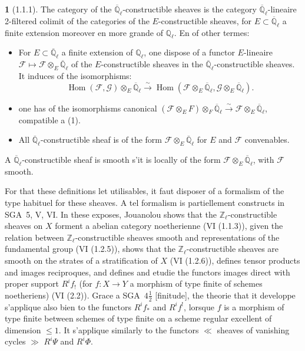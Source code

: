 \documentclass[12pt,a4paper]{article}
\theoremstyle{plain}
\theoremstyle{definition}
\theoremstyle{definition}
\newtheorem{para}{}[section]
\theoremstyle{remark}
\DeclareMathOperator{\Hom}{Hom}
\begin{document}
\begin{para}[1.1.1]
The category of the $\overline{\mathbb{Q}}_\ell$-constructible sheaves is the category $\overline{\mathbb{Q}}_\ell$-lineaire 2-filtered colimit of the categories of the $E$-constructible sheaves, for $E \subset \overline{\mathbb{Q}}_\ell$ a finite extension moreover en more grande of $\mathbb{Q}_\ell$. En of other termes:
\begin{itemize}[nosep]
\item[$\alpha$)] For $E \subset \overline{\mathbb{Q}}_\ell$ a finite extension of $\mathbb{Q}_\ell$, one dispose of a functor $E$-lineaire $\mathscr{F} \mapsto \mathscr{F} \otimes_E \overline{\mathbb{Q}}_\ell$ of the $E$-constructible sheaves in the $\overline{\mathbb{Q}}_\ell$-constructible sheaves. It induces of the isomorphisms:
\[\Hom(\mathscr{F}, \mathscr{G}) \otimes_E \overline{\mathbb{Q}}_\ell \xrightarrow{\sim} \Hom(\mathscr{F} \otimes_E \overline{\mathbb{Q}}_\ell, \mathscr{G} \otimes_E \overline{\mathbb{Q}}_\ell).\]
\item[$\beta$)] one has of the isomorphisms canonical $(\mathscr{F} \otimes_E F) \otimes_F \overline{\mathbb{Q}}_\ell \xrightarrow{\sim} \mathscr{F} \otimes_E \overline{\mathbb{Q}}_\ell$, compatible a (1).
\item[$\gamma$)] All $\overline{\mathbb{Q}}_\ell$-constructible sheaf is of the form $\mathscr{F} \otimes_E \overline{\mathbb{Q}}_\ell$ for $E$ and $\mathscr{F}$ convenables.
\end{itemize}

A $\overline{\mathbb{Q}}_\ell$-constructible sheaf is smooth s'it is locally of the form $\mathscr{F} \otimes_E \overline{\mathbb{Q}}_\ell$, with $\mathscr{F}$ smooth.

For that these definitions let utilisables, it faut disposer of a formalism of the type habituel for these sheaves. A tel formalism is partiellement constructs in SGA~5, V, VI. In these exposes, Jouanolou shows that the $\mathbb{Z}_\ell$-constructible sheaves on $X$ forment a abelian category noetherienne (VI (1.1.3)), given the relation between $\mathbb{Z}_\ell$-constructible sheaves smooth and representations of the fundamental group (VI (1.2.5)), shows that the $\mathbb{Z}_\ell$-constructible sheaves are smooth on the strates of a stratification of $X$ (VI (1.2.6)), defines tensor products and images reciproques, and defines and etudie the functors images direct with proper support $R^i f_!$ (for $f: X \to Y$ a morphism of type finite of schemes noetheriens) (VI (2.2)). Grace a SGA~$4\frac{1}{2}$ [finitude], the theorie that it developpe s'applique also bien to the functors $R^i f_*$ and $R^i f^!$, lorsque $f$ is a morphism of type finite between schemes of type finite on a scheme regular excellent of dimension $\leq 1$. It s'applique similarly to the functors $\ll$ sheaves of vanishing cycles $\gg$ $R^i \Psi$ and $R^i \Phi$.
\end{para}
\end{document}
